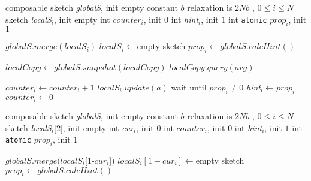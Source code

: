 \begin{algorithm}[htb]
    \footnotesize
   \begin{multicols}{2}
    \begin{algorithmic}[1]
    \setcounter{ALG@line}{100}

    \Vars
    \State composable sketch \emph{globalS}, init empty
    \State constant $b$ \Comment relaxation is $2Nb$
     , $0 \leq i \leq N$
        \State sketch \emph{localS$_i$}, init empty
	\State
        \State int $counter_i$, init $0$
        \State int \emph{hint}$_i$, init $1$
        \State int {\tt atomic} $prop_i$, init $1$
    \EndFor
    \EndFor

        \State $globalS.merge(localS_i)$ \label{fc-l:merge}
        \State $localS_i  \leftarrow $empty sketch \label{fc-l:emptyAux}
		\State $prop_i \leftarrow globalS.calcHint()$ \label{fc-l:calcHint}
    \EndFor
    \EndWhile
    \EndProcedure

   

    \State $localCopy \leftarrow globalS.snapshot(localCopy)$
    \State \Return $localCopy.query(arg)$
    \EndProcedure
    
     \Return \label{fc-l:shouldAdd}
    \EndIf
    \State $counter_i \leftarrow counter_i + 1$ \label{fc-l:countup}
    \State $localS_i.update(a)$ \label{fc-l:update}
     \label{fc-l:checkfull}
     \label{fc-l:signal}
    \State wait until $prop_i \neq 0$ \label{fc-l:wait}
     \State
    \State \emph{hint}$_i \leftarrow prop_i$ \label{fc-l:updateHint}
    \State $counter_i \leftarrow 0$ \label{fc-l:zeroCounter}
    \State
    \EndIf
    \EndProcedure

\columnbreak
    \setcounter{ALG@line}{200}
    \Vars
    \State composable sketch \emph{globalS}, init empty
    \State constant $b$ \Comment relaxation is $2Nb$
     , $0 \leq i \leq N$
        \State sketch \emph{localS$_i$}[$2$], init empty
        \State int \emph{cur}$_i$, init 0
        \State int $counter_i$, init $0$
        \State int \emph{hint}$_i$, init $1$
        \State int {\tt atomic} $prop_i$, init $1$
    \EndFor
    \EndFor

        \State $globalS.merge(localS_i$[1-$cur_i$]$)$ 
        \State $localS_i[1-cur_i] \leftarrow $empty sketch 
		\State $prop_i \leftarrow globalS.calcHint()$ 
    \EndFor
    \EndWhile
    \EndProcedure
   

\end{algorithmic}
\end{multicols}
\end{algorithm}
